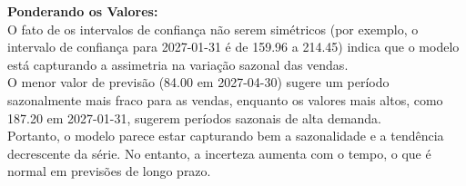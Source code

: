 \documentclass[a4paper, 12pt]{article}
\begin{document}
\textbf{Ponderando os Valores:}\\
O fato de os intervalos de confiança não serem simétricos (por exemplo, o intervalo de confiança para 2027-01-31 é de 159.96 a 214.45) indica que o modelo está capturando a assimetria na variação sazonal das vendas.\\
O menor valor de previsão (84.00 em 2027-04-30) sugere um período sazonalmente mais fraco para as vendas, enquanto os valores mais altos, como 187.20 em 2027-01-31, sugerem períodos sazonais de alta demanda.\\

Portanto, o modelo parece estar capturando bem a sazonalidade e a tendência decrescente da série. No entanto, a incerteza aumenta com o tempo, o que é normal em previsões de longo prazo.\\


\newpage
\end{document}
